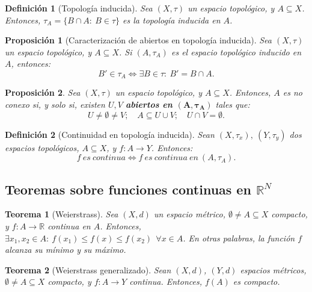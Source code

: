 \documentclass[11pt, a4paper, titlepage]{article}
\newcommand{\bm}[1]{\boldsymbol{#1}}
\theoremstyle{theorem-style}
\newtheorem*{nth}{Teorema}
\newtheorem*{nprop}{Proposición}
\theoremstyle{definition-style}
\newtheorem*{ndef}{Definición}
\theoremstyle{remark-style}
\theoremstyle{example-style}
\begin{document}
\begin{ndef}[Topología inducida]
Sea $(X,\tau)$ un espacio topológico, y $A\subseteq X$. Entonces, $\tau_A = \{B\cap A: \ B \in \tau\}$ es la \textit{topología inducida en $A$}.
\end{ndef}



\begin{nprop}[Caracterización de abiertos en topología inducida]
Sea $(X,\tau)$ un espacio topológico, y $A\subseteq X$. Si $(A,\tau_A)$ es el espacio topológico inducido en $A$, entonces: $$B' \in \tau_A \iff \exists B\in \tau: \ B' = B\cap A.$$
\end{nprop}



\begin{nprop}
Sea $(X,\tau)$ un espacio topológico, y $A\subseteq X$. Entonces, $A$ es no conexo si, y solo si, existen $U,V$ \textbf{abiertos en $\bm{(A,\tau_A)}$} tales que: $$U \ne \emptyset \ne V;\quad A \subseteq U \cup V;\quad U \cap V = \emptyset.$$
\end{nprop}



\begin{ndef}[Continuidad en topología inducida]
Sean $(X,\tau_x),\ (Y,\tau_y)$ dos espacios topológicos, $A\subseteq X$, y $f:A\longrightarrow Y$. Entonces: $$f\ es\ continua \iff f\ es\ continua\ en\ (A,\tau_A).$$
\end{ndef}



\subsection{Teoremas sobre funciones continuas en $\mathbb{R}^N$}



\begin{nth}[Weierstrass]
Sea $(X,d)$ un espacio métrico, $\emptyset \ne A \subseteq X$ compacto, y $f:A \longrightarrow \mathbb{R}$ continua en $A$. Entonces, $\exists x_1,x_2 \in A: \ f(x_1)\le f(x) \le f(x_2)\ \ \forall x\in A$. En otras palabras, la función $f$ alcanza su mínimo y su máximo.
\end{nth}



\begin{nth}[Weierstrass generalizado]
Sean $(X,d)$, $(Y,d)$ espacios métricos, $\emptyset \ne A \subseteq X$ compacto, y $f: A \longrightarrow Y$ continua. Entonces, $f(A)$ es compacto.
\end{nth}
\end{document}
